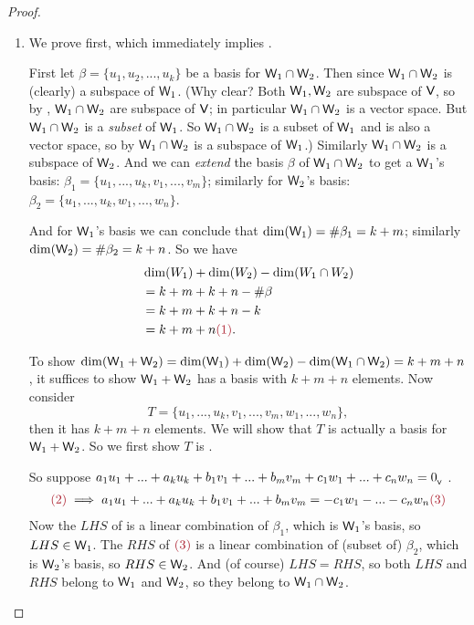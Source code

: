 \begin{proof} \ 

\begin{enumerate}
\item
We prove  first, which immediately implies .

First let \(\beta = \{ u_1, u_2, ..., u_k \}\) be a basis for \(\textsf{W}_1 \cap \textsf{W}_2\).
Then since \(\textsf{W}_1 \cap \textsf{W}_2\) is (clearly) a subspace of \(\textsf{W}_1\). (Why clear? Both \(\textsf{W}_1, \textsf{W}_2\) are subspace of \(\textsf{V}\), so by , \(\textsf{W}_1 \cap \textsf{W}_2\) are subspace of \(\textsf{V}\);
in particular \(\textsf{W}_1 \cap \textsf{W}_2\) is a vector space.
But \(\textsf{W}_1 \cap \textsf{W}_2\) is a \emph{subset} of \(\textsf{W}_1\).
So \(\textsf{W}_1 \cap \textsf{W}_2\) is a subset of \(\textsf{W}_1\) and is also a vector space, so by  \(\textsf{W}_1 \cap \textsf{W}_2\) is a subspace of \(\textsf{W}_1\).)
Similarly \(\textsf{W}_1 \cap \textsf{W}_2\) is a subspace of \(\textsf{W}_2\).
And  we can \emph{extend} the basis \(\beta\) of \(\textsf{W}_1 \cap \textsf{W}_2\) to get a \(\textsf{W}_1\)'s basis: \(\beta_1 = \{ u_1, ..., u_k, v_1, ..., v_m \}\);
similarly for \(\textsf{W}_2\)'s basis: \(\beta_2 = \{ u_1, ..., u_k, w_1, ..., w_n \}\).

And for \(\textsf{W}_1\)'s basis we can conclude that \(\dim(\textsf{W}_1) = \#\beta_1 = k + m\);
similarly \(\dim(\textsf{W}_2) = \#\beta_2 = k + n\).
So we have
\begin{align*}
    & \dim(W_1) + \dim(W_2) - \dim(W_1 \cap W_2) \\
    & = k + m + k + n - \#\beta \\
    & = k + m + k + n - k \\ 
    & = k + m + n \MAROON{(1)}.
\end{align*}

\sloppy To show \(\dim(\textsf{W}_1 + \textsf{W}_2) = \dim(\textsf{W}_1) + \dim(\textsf{W}_2) - \dim(\textsf{W}_1 \cap \textsf{W}_2) = k + m + n\), it suffices to show \(\textsf{W}_1 + \textsf{W}_2\) has a basis with \(k + m + n\) elements.
Now consider
\[
    T = \{ u_1, ..., u_k, v_1, ..., v_m, w_1, ..., w_n \},
\]
then it has \(k + m + n\) elements.
We will show that \(T\) is actually a basis for \(\textsf{W}_1 + \textsf{W}_2\).
So we first show \(T\) is \LID{}.

So suppose \(a_1 u_1 + ... + a_k u_k + b_1 v_1 + ... + b_m v_m + c_1 w_1 + ... + c_n w_n = 0_{_{\textsf{V}}}\) .
\begin{align*}
    \MAROON{(2)} \implies a_1 u_1 + ... + a_k u_k + b_1 v_1 + ... + b_m v_m = - c_1 w_1 - ... - c_n w_n \MAROON{(3)}
\end{align*}
Now the \(LHS\) of  is a linear combination of \(\beta_1\), which is \(\textsf{W}_1\)'s basis, so \(LHS \in \textsf{W}_1\).
The \(RHS\) of \(\MAROON{(3)}\) is a linear combination of (subset of) \(\beta_2\), which is \(\textsf{W}_2\)'s basis, so \(RHS \in \textsf{W}_2\).
And (of course) \(LHS = RHS\), so both \(LHS\) and \(RHS\) belong to \(\textsf{W}_1\) and \(\textsf{W}_2\), so they belong to \(\textsf{W}_1 \cap \textsf{W}_2\).


\end{enumerate}
\end{proof}
